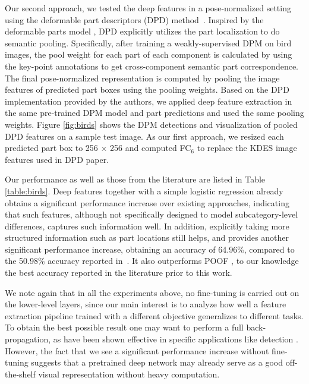 Our second approach, we tested the deep features in a pose-normalized setting using the deformable part descriptors (DPD) method~\cite{dpd}. Inspired by the deformable parts model \cite{dpm}, DPD explicitly utilizes the part localization to do semantic pooling. Specifically, after training a weakly-supervised DPM on bird images, the pool weight for each part of each component is calculated by using the key-point annotations to get cross-component semantic part correspondence. The final pose-normalized representation is computed by pooling the image features of predicted part boxes using the pooling weights. Based on the DPD implementation provided by the authors, we applied deep feature extraction in the same pre-trained DPM model and part predictions and used the same pooling weights. Figure \ref{fig:birds} shows the DPM detections and visualization of pooled DPD features on a sample test image.  As our first approach, we resized each predicted part box to 256 $\times$ 256 and computed FC$_6$ to replace the KDES image features \cite{kdes} used in DPD paper.

Our performance as well as those from the literature are listed in Table \ref{table:birds}. Deep features together with a simple logistic regression already obtains a significant performance increase over existing approaches, indicating that such features, although not specifically designed to model subcategory-level differences, captures such information well. In addition, explicitly taking more structured information such as part locations still helps, and provides another significant performance increase, obtaining an accuracy of 64.96\%, compared to the 50.98\% accuracy reported in~\cite{dpd}. It also outperforms POOF \cite{poof}, to our knowledge the best accuracy reported in the literature prior to this work.

We note again that in all the experiments above, no fine-tuning is carried out on the lower-level layers, since our main interest is to analyze how well a feature extraction pipeline trained with a different objective generalizes to different tasks. To obtain the best possible result one may want to perform a full back-propagation, as have been shown effective in specific applications like detection \cite{girshick2013rich}. However, the fact
that we see a significant performance increase without fine-tuning suggests that
a pretrained deep network may already serve as a good off-the-shelf visual representation without heavy computation.

